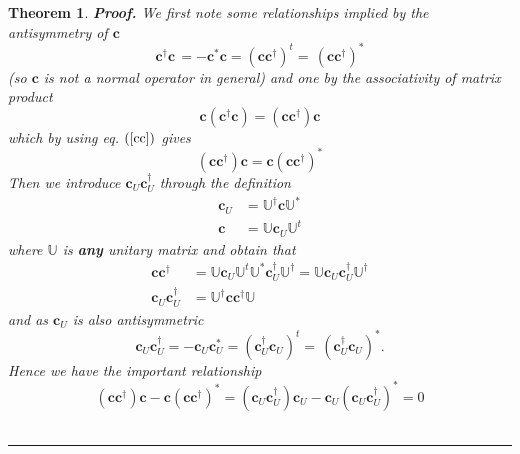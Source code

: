 \documentclass[aps,preprint]{revtex4}%
\newtheorem{theorem}{Theorem}
\newenvironment{proof}[1][Proof]{\noindent\textbf{#1.} }{\ \rule{0.5em}{0.5em}}
\begin{document}
\begin{theorem}
\begin{proof}
We first note some relationships implied by the antisymmetry of $\mathbf{c}$%
\begin{equation}
\mathbf{c}^{\dagger}\mathbf{c\,=-c}^{\ast}\mathbf{c}=\left(  \mathbf{cc}%
^{\dagger}\right)  ^{t}=\mathbf{\,}\left(  \mathbf{cc}^{\dagger}\right)
^{\ast} \label{cc}%
\end{equation}
(so $\mathbf{c}$ is not a normal operator in general) and one by the
associativity of matrix product
\begin{equation}
\mathbf{c}\left(  \mathbf{c}^{\dagger}\mathbf{c}\right)  =\left(
\mathbf{cc}^{\dagger}\right)  \mathbf{c}%
\end{equation}
which by using eq. $\left(  \ref{cc}\right)  $ gives
\begin{equation}
\left(  \mathbf{cc}^{\dagger}\right)  \mathbf{c=c}\left(  \mathbf{cc}%
^{\dagger}\right)  ^{\ast} \label{cr}%
\end{equation}
Then we introduce $\mathbf{c}_{U}\mathbf{c}_{U}^{\dagger}$ through the
definition
\begin{align}
\mathbf{c}_{U}  &  =\mathbb{U}^{\dagger}\mathbf{c}\mathbb{U}^{\ast}\nonumber\\
\mathbf{c}  &  =\mathbb{U}\mathbf{c}_{U}\mathbb{U}^{t}%
\end{align}
where $\mathbb{U}$ is \textbf{any} unitary matrix and obtain that
\begin{align}
\mathbf{cc}^{\dagger}  &  =\mathbb{U}\mathbf{c}_{U}\mathbb{U}^{t}%
\mathbb{U}^{\ast}\mathbf{c}_{U}^{\dagger}\mathbb{U}^{\dagger}=\mathbb{U}%
\mathbf{c}_{U}\mathbf{c}_{U}^{\dagger}\mathbb{U}^{\dagger}\nonumber\\
\mathbf{c}_{U}\mathbf{c}_{U}^{\dagger}  &  =\mathbb{U}^{\dagger}%
\mathbf{cc}^{\dagger}\mathbb{U}%
\end{align}
and as $\mathbf{c}_{U}$ is also antisymmetric
\begin{equation}
\mathbf{c}_{U}\mathbf{c}_{U}^{\dagger}=-\mathbf{c}_{U}\mathbf{c}_{U}^{\ast
}=\left(  \mathbf{c}_{U}^{\dagger}\mathbf{c}_{U}\right)  ^{t}=\mathbf{\,}%
\left(  \mathbf{c}_{U}^{\dagger}\mathbf{c}_{U}\right)  ^{\ast}.
\end{equation}
Hence we have the important relationship
\begin{equation}
\left(  \mathbf{cc}^{\dagger}\right)  \mathbf{c-c}\left(  \mathbf{cc}%
^{\dagger}\right)  ^{\ast}=\left(  \mathbf{c}_{U}\mathbf{c}_{U}^{\dagger
}\right)  \mathbf{c}_{U}-\mathbf{c}_{U}\left(  \mathbf{c}_{U}\mathbf{c}%
_{U}^{\dagger}\right)  ^{\ast}=0 \label{cu}%

\end{equation}
\end{proof}
\end{theorem}
\end{document}
